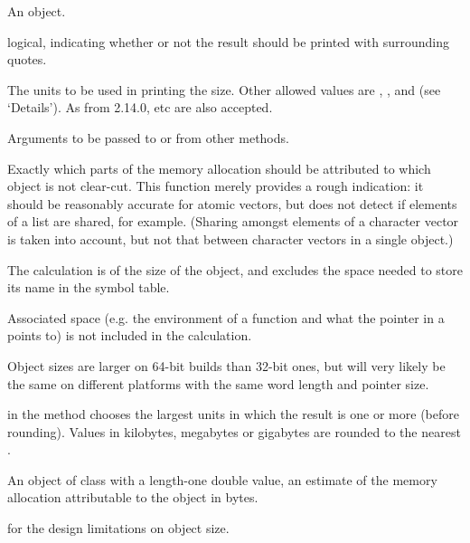 %
\begin{Arguments}
\begin{ldescription}
\item[\code{x}] An \R{} object.
\item[\code{quote}] logical, indicating whether or not the result should be
printed with surrounding quotes.
\item[\code{units}] The units to be used in printing the size.  Other allowed
values are , ,  and 
(see `Details').
As from \R{} 2.14.0,  etc are also accepted.
\item[\code{...}] Arguments to be passed to or from other methods.
\end{ldescription}
\end{Arguments}
%
\begin{Details}\relax
Exactly which parts of the memory allocation should be attributed to
which object is not clear-cut.  This function merely provides a rough
indication: it should be reasonably accurate for atomic vectors, but
does not detect if elements of a list are shared, for example.
(Sharing amongst elements of a character vector is taken into account,
but not that between character vectors in a single object.)

The calculation is of the size of the object, and excludes the space
needed to store its name in the symbol table.

Associated space (e.g. the environment of a function and what the
pointer in a  points to) is not included in the
calculation.

Object sizes are larger on 64-bit builds than 32-bit ones, but will
very likely be the same on different platforms with the same word
length and pointer size.

 in the  method chooses the largest
units in which the result is one or more (before rounding).  Values in
kilobytes, megabytes or gigabytes are rounded to the nearest .
\end{Details}
%
\begin{Value}
An object of class  with a length-one double value,
an estimate of the memory allocation attributable to the object in bytes.
\end{Value}
%
\begin{SeeAlso}\relax
{} for the design limitations on object size.
\end{SeeAlso}
